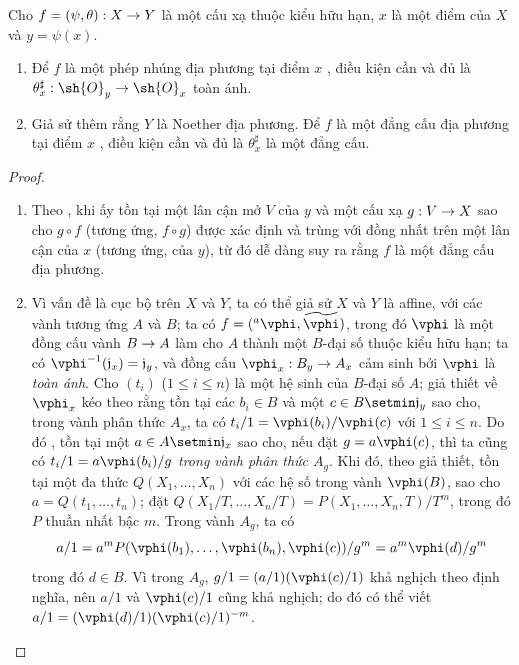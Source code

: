 \documentclass[oneside]{amsart}
\makeatletter
\renewcommand{\leq}{\leqslant}
\newcommand{\ega@arrow}[2]{\mathchoice{#1}{#2}{#2}{#2}}
\renewcommand{\to}{\ega@arrow{\longrightarrow}{\rightarrow}}
\newcommand{\oldpage}[2][]{{\marginnote{\normalfont\textbf{#1}~|~#2}}\ignorespaces}
\let\EGAOriginalLabel\label
\renewcommand{\label}[1]{\phantomsection\EGAOriginalLabel{#1}}
\makeatother
\begin{document}
\begin{proposition}[6.5.4]
\label{I.6.5.4}
Cho $f=(\psi,\theta):X\to Y$ là một cấu xạ thuộc kiểu hữu hạn, $x$ là một điểm của $X$ và $y=\psi(x)$.
\begin{enumerate}
  \item[{\rm(i)}] Để $f$ là một phép nhúng địa phương tại điểm $x$ , điều kiện cần và đủ là $\theta_x^\sharp:\sh{O}_y\to\sh{O}_x$ toàn ánh.
  \item[{\rm(ii)}] Giả sử thêm rằng $Y$ là Noether địa phương.
    Để $f$ là một đẳng cấu địa phương tại điểm $x$ , điều kiện cần và đủ là $\theta_x^\sharp$ là một đẳng cấu.
\end{enumerate}
\end{proposition}

\begin{proof}
\medskip\noindent
\begin{enumerate}
  \item[(ii)] Theo , khi ấy tồn tại một lân cận mở $V$ của $y$ và một cấu xạ $g:V\to X$ sao cho $g\circ f$ (tương ứng, $f\circ g$) được xác định và trùng với đồng nhất trên một lân cận của $x$ (tương ứng, của $y$), từ đó dễ dàng suy ra rằng $f$ là một đẳng cấu địa phương.
  \item[(i)] Vì vấn đề là cục bộ trên $X$ và $Y$, ta có thể giả sử $X$ và $Y$ là affine, với các vành tương ứng $A$ và $B$;
    ta có $f=({}^a\vphi,\widetilde{\vphi})$, trong đó $\vphi$ là một đồng cấu vành $B\to A$ làm cho $A$ thành một $B$-đại số thuộc kiểu hữu hạn;
    ta có $\vphi^{-1}(\mathfrak{j}_x)=\mathfrak{j}_y$, và đồng cấu $\vphi_x:B_y\to A_x$ cảm sinh bởi $\vphi$ là \emph{toàn ánh}.
    Cho $(t_i)$ ($1\leq i\leq n$) là một hệ sinh của $B$-đại số $A$;
    giả thiết về $\vphi_x$ kéo theo rằng tồn tại các $b_i\in B$ và một $c\in B\setmin\mathfrak{j}_y$ sao cho, trong vành phân thức $A_x$, ta có $t_i/1=\vphi(b_i)/\vphi(c)$ với $1\leq i\leq n$.
    Do đó , tồn tại một $a\in A\setmin\mathfrak{j}_x$ sao cho, nếu đặt $g=a\vphi(c)$, thì ta cũng có $t_i/1=a\vphi(b_i)/g$ \emph{trong vành phân thức $A_g$}.
    Khi đó, theo giả thiết, tồn tại một đa thức $Q(X_1,\ldots,X_n)$ với các hệ số trong vành $\vphi(B)$,
\oldpage[I]{152}
    sao cho $a=Q(t_1,\ldots,t_n)$;
    đặt $Q(X_1/T,\ldots,X_n/T)=P(X_1,\ldots,X_n,T)/T^m$, trong đó $P$ thuần nhất bậc $m$.
    Trong vành $A_g$, ta có
    \[
      a/1=a^mP(\vphi(b_1),\ldots,\vphi(b_n),\vphi(c))/g^m=a^m\vphi(d)/g^m
    \]
    trong đó $d\in B$.
    Vì trong $A_g$, $g/1=(a/1)(\vphi(c)/1)$ khả nghịch theo định nghĩa, nên $a/1$ và $\vphi(c)/1$ cũng khả nghịch; do đó có thể viết $a/1=(\vphi(d)/1)(\vphi(c)/1)^{-m}$.

\end{enumerate}
\end{proof}
\end{document}
